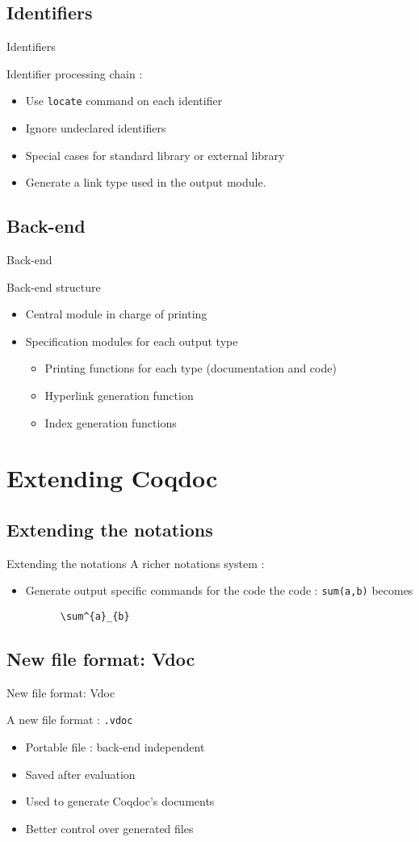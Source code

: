 \documentclass[compress]{beamer}
\newenvironment{tframe}[1]{
  \subsection{#1}
  \begin{frame}{#1}
  }{
  \end{frame}
  }
\begin{document}
  \begin{tframe}{Identifiers}
    Identifier processing chain :
    \begin{itemize}
      \item Use \texttt{locate} command on each identifier
      \item Ignore undeclared identifiers
      \item Special cases for standard library or external library
      \item Generate a link type used in the output module.
    \end{itemize}
  \end{tframe}

  \begin{tframe}{Back-end}
    Back-end structure
    \begin{itemize}
      \item Central module in charge of printing
      \item Specification modules for each output type
        \begin{itemize}
          \item Printing functions for each type (documentation and code)
          \item Hyperlink generation function
          \item Index generation functions
        \end{itemize}
    \end{itemize}
  \end{tframe}

\section{Extending Coqdoc}
\subsection{Extending the notations}
\begin{frame}[containsverbatim]{Extending the notations}
  A richer notations system :
  \begin{itemize}
    \item Generate output specific commands for the code
      the code : \texttt{sum(a,b)} becomes
      \begin{verbatim}
      \sum^{a}_{b}
      \end{verbatim}
  \end{itemize}
\end{frame}
\begin{tframe}{New file format: Vdoc}
  A new file format : \texttt{.vdoc}
  \begin{itemize}
    \item Portable file : back-end independent
    \item Saved after evaluation
    \item Used to generate Coqdoc's documents
    \item Better control over generated files
  \end{itemize}
\end{tframe}
\end{document}
